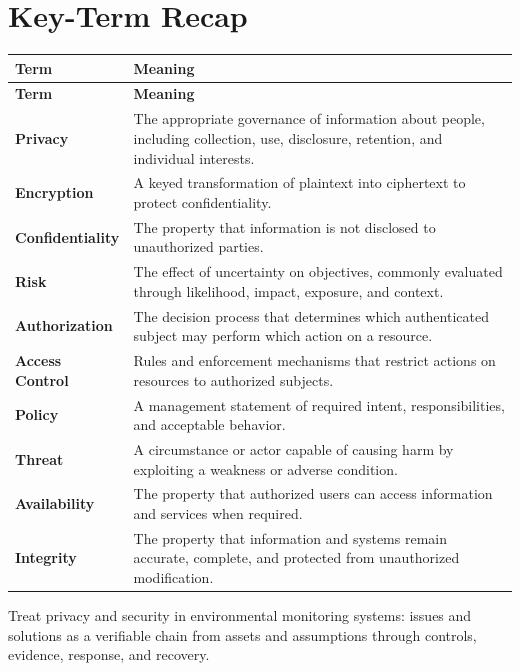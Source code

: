 \documentclass[11pt]{article}
\begin{document}
\section*{Key-Term Recap}
\begin{longtable}{>{\RaggedRight\arraybackslash}p{}>{\RaggedRight\arraybackslash}p{}}
\toprule\rowcolor{Navy}\color{white}\textbf{Term} & \color{white}\textbf{Meaning}\\\midrule
\endfirsthead
\toprule\rowcolor{Navy}\color{white}\textbf{Term} & \color{white}\textbf{Meaning}\\\midrule
\endhead
\textbf{Privacy} & The appropriate governance of information about people, including collection, use, disclosure, retention, and individual interests. \\\midrule
\textbf{Encryption} & A keyed transformation of plaintext into ciphertext to protect confidentiality. \\\midrule
\textbf{Confidentiality} & The property that information is not disclosed to unauthorized parties. \\\midrule
\textbf{Risk} & The effect of uncertainty on objectives, commonly evaluated through likelihood, impact, exposure, and context. \\\midrule
\textbf{Authorization} & The decision process that determines which authenticated subject may perform which action on a resource. \\\midrule
\textbf{Access Control} & Rules and enforcement mechanisms that restrict actions on resources to authorized subjects. \\\midrule
\textbf{Policy} & A management statement of required intent, responsibilities, and acceptable behavior. \\\midrule
\textbf{Threat} & A circumstance or actor capable of causing harm by exploiting a weakness or adverse condition. \\\midrule
\textbf{Availability} & The property that authorized users can access information and services when required. \\\midrule
\textbf{Integrity} & The property that information and systems remain accurate, complete, and protected from unauthorized modification. \\\midrule
\bottomrule
\end{longtable}
\begin{takeawaybox}
Treat privacy and security in environmental monitoring systems: issues and solutions as a verifiable chain from assets and assumptions through controls, evidence, response, and recovery.
\end{takeawaybox}
\end{document}
